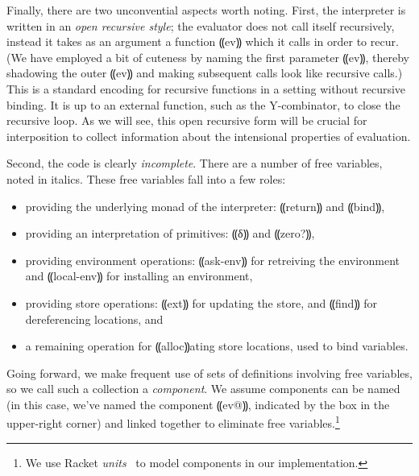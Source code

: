 Finally, there are two unconvential aspects worth noting.  First, the
interpreter is written in an \emph{open recursive style}; the evaluator does
not call itself recursively, instead it takes as an argument a function
⸨ev⸩ which it calls in order to recur.  (We have employed a bit of
cuteness by naming the first parameter ⸨ev⸩, thereby shadowing the outer
⸨ev⸩ and making subsequent calls look like recursive calls.)  This is a
standard encoding for recursive functions in a setting without recursive
binding.  It is up to an external function, such as the Y-combinator, to close
the recursive loop.  As we will see, this open recursive form will be crucial
for interposition to collect information about the intensional properties of
evaluation.

Second, the code is clearly \emph{incomplete}.  There are a number
of free variables, noted in italics.  These free variables fall into
a few roles:
\begin{itemize}
\item providing the underlying monad of the interpreter:
⸨return⸩ and ⸨bind⸩,

\item providing an interpretation of primitives: ⸨δ⸩ and
⸨zero?⸩,

\item providing environment operations: ⸨ask-env⸩ for
retreiving the environment and ⸨local-env⸩ for installing an
environment,

\item providing store operations: ⸨ext⸩ for updating
the store, and ⸨find⸩ for dereferencing locations, and

\item a remaining operation for ⸨alloc⸩ating store locations,
used to bind variables.
\end{itemize}

Going forward, we make frequent use of sets of definitions involving free
variables, so we call such a collection a \emph{component}. We assume
components can be named (in this case, we've named the component ⸨ev@⸩,
indicated by the box in the upper-right corner) and linked together to
eliminate free variables.\footnote{We use Racket
\emph{units}~\cite{local:flatt-pldi98} to model components in our
implementation.}

